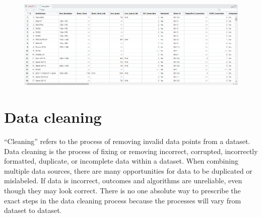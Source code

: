 \documentclass[a4paper]{article}
\begin{document}
\begin{figure}[H]
    \centering
    \includegraphics[keepaspectratio, width=1\textwidth, height=1\textheight]{Import/1.png}
\end{figure}



\section{Data cleaning}
“Cleaning” refers to the process of removing invalid data points from a dataset.\\
Data cleaning is the process of fixing or removing incorrect, corrupted, incorrectly formatted, duplicate, or incomplete data within a dataset. When combining multiple data sources, there are many opportunities for data to be duplicated or mislabeled. If data is incorrect, outcomes and algorithms are unreliable, even though they may look correct. There is no one absolute way to prescribe the exact steps in the data cleaning process because the processes will vary from dataset to dataset.
\end{document}

